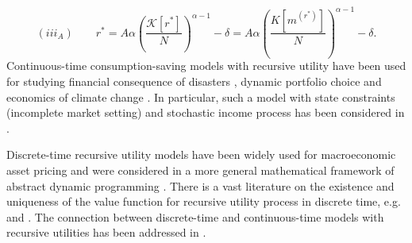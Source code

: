 \documentclass[11pt]{article}
\numberwithin{equation}{section}
\theoremstyle{definition}
\theoremstyle{plain}
\begin{document}
\begin{equation}\label{Aiyagari}
(iii_A)\qquad r^*=A\alpha \left(\frac{\mathcal{K}[r^*]}{N}\right)^{\alpha-1}-\delta=A\alpha \left(\frac{K[m^{(r^*)}]}{N}\right)^{\alpha-1}-\delta. 
\end{equation}
Continuous-time consumption-saving models with recursive utility have been used for studying {}{financial consequence of disasters} \cite{pindyck2013economic}, dynamic portfolio choice \cite{dimmock2024endowment} and economics of climate change \cite{hong2023mitigating}. In particular, {}{such a model with state constraints} (incomplete market setting) and stochastic income process has been considered in \cite{wang2016optimal}. \par
Discrete-time recursive utility models have been widely used for macroeconomic asset pricing \cite{fernandez2021estimating,guvenen2009parsimonious,hansen2008consumption} and {}{were} considered in a more general mathematical framework of abstract dynamic programming \cite{Sargent2025,Sargent_Stachurski_2025}. There is a vast literature on the existence and uniqueness of the value function for recursive utility process in discrete time, e.g. \cite{bloise2024not} and \cite{BOROVICKA2020}. The connection between discrete-time and continuous-time models with recursive utilities has been addressed in \cite{kraft2014stochastic}.\par
\end{document}
